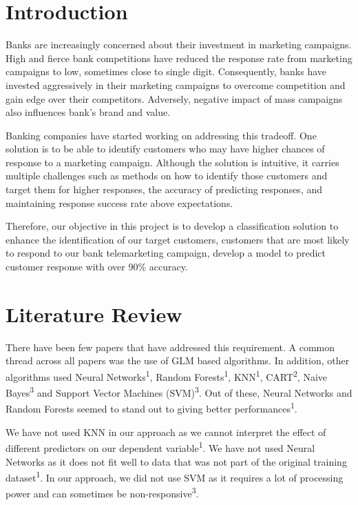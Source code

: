 \documentclass[english,floatsintext,man]{apa6}
\begin{document}
\section{Introduction}\label{introduction}

Banks are increasingly concerned about their investment in marketing
campaigns. High and fierce bank competitions have reduced the response
rate from marketing campaigns to low, sometimes close to single digit.
Consequently, banks have invested aggressively in their marketing
campaigns to overcome competition and gain edge over their competitors.
Adversely, negative impact of mass campaigns also influences bank's
brand and value.

Banking companies have started working on addressing this tradeoff. One
solution is to be able to identify customers who may have higher chances
of response to a marketing campaign. Although the solution is intuitive,
it carries multiple challenges such as methods on how to identify those
customers and target them for higher responses, the accuracy of
predicting responses, and maintaining response success rate above
expectations.

Therefore, our objective in this project is to develop a classification
solution to enhance the identification of our target customers,
customers that are most likely to respond to our bank telemarketing
campaign, develop a model to predict customer response with over 90\%
accuracy.

\section{Literature Review}\label{literature-review}

There have been few papers that have addressed this requirement. A
common thread across all papers was the use of GLM based algorithms. In
addition, other algorithms used Neural Networks\textsuperscript{1},
Random Forests\textsuperscript{1}, KNN\textsuperscript{1},
CART\textsuperscript{2}, Naive Bayes\textsuperscript{3} and Support
Vector Machines (SVM)\textsuperscript{3}. Out of these, Neural Networks
and Random Forests seemed to stand out to giving better
performances\textsuperscript{1}.

We have not used KNN in our approach as we cannot interpret the effect
of different predictors on our dependent variable\textsuperscript{1}. We
have not used Neural Networks as it does not fit well to data that was
not part of the original training dataset\textsuperscript{1}. In our
approach, we did not use SVM as it requires a lot of processing power
and can sometimes be non-responsive\textsuperscript{3}.
\end{document}
